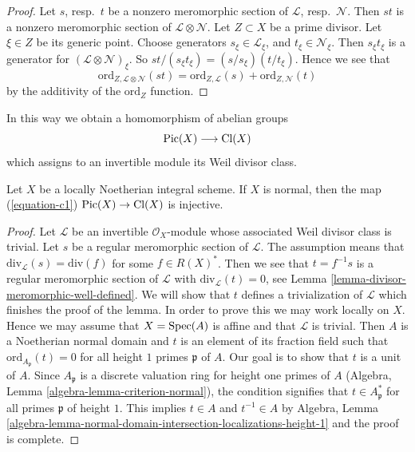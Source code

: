 \begin{proof}
Let $s$, resp.\ $t$ be a nonzero meromorphic section
of $\mathcal{L}$, resp.\ $\mathcal{N}$. Then $st$ is a nonzero
meromorphic section of $\mathcal{L} \otimes \mathcal{N}$.
Let $Z \subset X$ be a prime divisor. Let $\xi \in Z$ be its generic
point. Choose generators $s_\xi \in \mathcal{L}_\xi$, and
$t_\xi \in \mathcal{N}_\xi$. Then $s_\xi t_\xi$ is a generator
for $(\mathcal{L} \otimes \mathcal{N})_\xi$.
So $st/(s_\xi t_\xi) = (s/s_\xi)(t/t_\xi)$.
Hence we see that
$$
\text{ord}_{Z, \mathcal{L} \otimes \mathcal{N}}(st)
=
\text{ord}_{Z, \mathcal{L}}(s) + \text{ord}_{Z, \mathcal{N}}(t)
$$
by the additivity of the $\text{ord}_Z$ function.
\end{proof}

\noindent
In this way we obtain a homomorphism of abelian groups
\begin{equation}
\label{equation-c1}
\mathop{\mathrm{Pic}}\nolimits(X) \longrightarrow \text{Cl}(X)
\end{equation}
which assigns to an invertible module its Weil divisor class.

\begin{lemma}
\label{lemma-normal-c1-injective}
Let $X$ be a locally Noetherian integral scheme. If $X$ is normal,
then the map (\ref{equation-c1}) $\mathop{\mathrm{Pic}}\nolimits(X) \to \text{Cl}(X)$
is injective.
\end{lemma}

\begin{proof}
Let $\mathcal{L}$ be an invertible $\mathcal{O}_X$-module whose
associated Weil divisor class is trivial. Let $s$ be a regular
meromorphic section of $\mathcal{L}$. The assumption means that
$\text{div}_\mathcal{L}(s) = \text{div}(f)$ for some
$f \in R(X)^*$. Then we see that $t = f^{-1}s$ is a regular
meromorphic section of $\mathcal{L}$ with
$\text{div}_\mathcal{L}(t) = 0$, see
Lemma \ref{lemma-divisor-meromorphic-well-defined}.
We will show that $t$ defines a trivialization of $\mathcal{L}$
which finishes the proof of the lemma.
In order to prove this we may work locally on $X$.
Hence we may assume that $X = \mathop{\mathrm{Spec}}(A)$ is affine
and that $\mathcal{L}$ is trivial. Then $A$ is a Noetherian normal
domain and $t$ is an element of its fraction field
such that $\text{ord}_{A_\mathfrak p}(t) = 0$
for all height $1$ primes $\mathfrak p$ of $A$.
Our goal is to show that $t$ is a unit of $A$.
Since $A_\mathfrak p$ is a discrete valuation ring for height
one primes of $A$ (Algebra, Lemma \ref{algebra-lemma-criterion-normal}), the
condition signifies that $t \in A_\mathfrak p^*$ for all primes $\mathfrak p$
of height $1$. This implies $t \in A$ and $t^{-1} \in A$ by
Algebra, Lemma
\ref{algebra-lemma-normal-domain-intersection-localizations-height-1}
and the proof is complete.
\end{proof}


